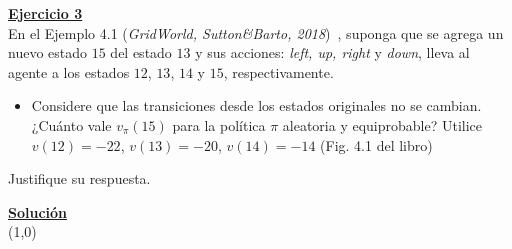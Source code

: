 \indent\underline{\textbf{Ejercicio 3}}\\
En el Ejemplo 4.1 (\textit{GridWorld, Sutton\&Barto, 2018})~\cite{Sutton2018}, suponga que se agrega un nuevo estado $15$ del estado $13$ y sus acciones: \textit{left, up, right} y \textit{down}, lleva al agente a los estados $12$, $13$, $14$ y $15$, respectivamente.

\begin{itemize}
    \item Considere que las transiciones desde los estados originales no se cambian.
    ¿Cuánto vale $v_{\pi}(15)$ para la política $\pi$ aleatoria y equiprobable?
    Utilice $v(12) = -22$, $v(13) = -20$, $v(14) = -14$ (Fig. 4.1 del libro)
\end{itemize}

Justifique su respuesta.

\indent\underline{\textbf{Solución}}\\

\line(1,0){\textwidth}
